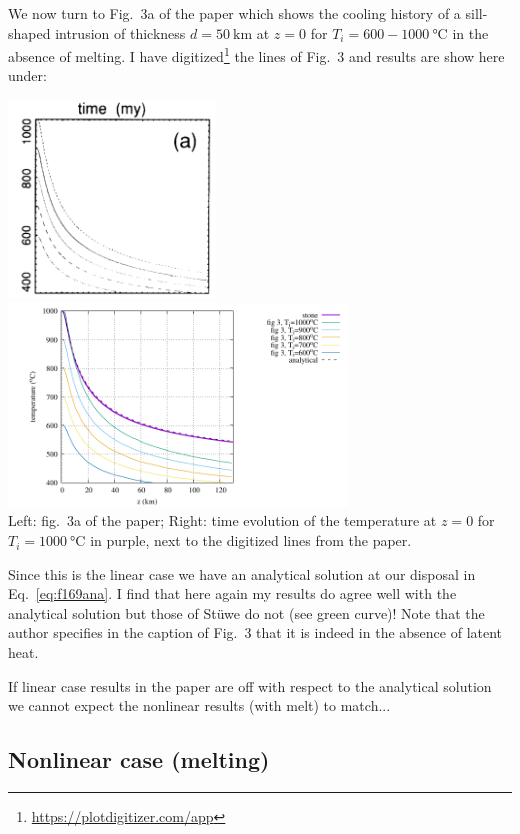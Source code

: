 We now turn to Fig.~3a of the paper which shows the 
cooling history of a sill-shaped intrusion of thickness $d=50~\si{\km}$ at $z=0$
for $T_i=600-1000~\si{\celsius}$ in the absence of melting. 
I have digitized\footnote{\url{https://plotdigitizer.com/app}} the lines of Fig.~3 
and results are show here under:
\begin{center}
\includegraphics[width=5.5cm]{python_codes/fieldstone_169/images/fig3a}
\includegraphics[width=9cm]{python_codes/fieldstone_169/results/linear/midT.pdf}\\
{\captionfont Left: fig.~3a of the paper; Right: time evolution of the 
temperature at $z=0$ for $T_i=1000~\si{\celsius}$ in purple, next to the 
digitized lines from the paper.}
\end{center}
Since this is the linear case we have an analytical solution at our disposal
in Eq.~\eqref{eq:f169ana}.
I find that here again my results do agree well with the analytical solution 
but those of St{\"u}we do not (see green curve)! Note that the author specifies 
in the caption of Fig.~3 that it is indeed in the absence of latent heat.

{\color{red} If linear case results in the paper are off 
with respect to the analytical solution we cannot 
expect the nonlinear results (with melt) to match...}



\subsection*{Nonlinear case (melting)}

